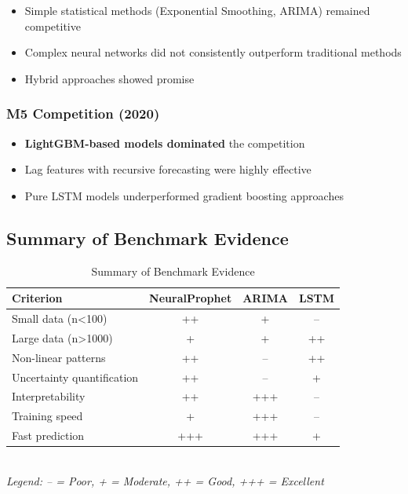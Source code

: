 \documentclass[12pt,a4paper]{article}
\begin{document}
\begin{itemize}
    \item Simple statistical methods (Exponential Smoothing, ARIMA) remained competitive
    \item Complex neural networks did not consistently outperform traditional methods
    \item Hybrid approaches showed promise
\end{itemize}

\subsubsection{M5 Competition (2020)}

\begin{itemize}
    \item \textbf{LightGBM-based models dominated} the competition
    \item Lag features with recursive forecasting were highly effective
    \item Pure LSTM models underperformed gradient boosting approaches
\end{itemize}

\subsection{Summary of Benchmark Evidence}

\begin{table}[htbp]
\centering
\caption{Summary of Benchmark Evidence}
\label{tab:benchmark_summary}
\begin{tabular}{|l|c|c|c|}
\hline
\textbf{Criterion} & \textbf{NeuralProphet} & \textbf{ARIMA} & \textbf{LSTM} \\
\hline
Small data (n<100) & ++ & + & -- \\
Large data (n>1000) & + & + & ++ \\
Non-linear patterns & ++ & -- & ++ \\
Uncertainty quantification & ++ & -- & + \\
Interpretability & ++ & +++ & -- \\
Training speed & + & +++ & -- \\
Fast prediction & +++ & +++ & + \\
\hline
\end{tabular}
\\
\vspace{0.2cm}
\textit{Legend: -- = Poor, + = Moderate, ++ = Good, +++ = Excellent}
\end{table}
\end{document}
